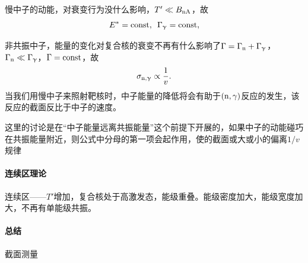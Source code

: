 慢中子的动能，对衰变行为没什么影响，$T' \ll B_{\mathrm n\mathrm{A}}$，故
\[
	E^\ast = \mathrm{const},\enspace\Gamma_\upgamma = \mathrm{const},
\]

非共振中子，能量的变化对复合核的衰变不再有什么影响了$\Gamma = \Gamma_\mathrm n + \Gamma_\upgamma$，$\Gamma_\mathrm n \ll \Gamma_\upgamma$，$\Gamma = \mathrm{const}$，故
\begin{align}
	\label{slow-neutron}
	\sigma_{\mathrm n,\upgamma} \propto \frac1v.
\end{align}
当我们用慢中子来照射靶核时，中子能量的降低将会有助于$(\mathrm n,\gamma)$反应的发生，该反应的截面反比于中子的速度。

这里的讨论是在“中子能量远离共振能量”这个前提下开展的，如果中子的动能碰巧在共振能量附近，则公式中分母的第一项会起作用，使的截面或大或小的偏离$1/v$规律
\paragraph{连续区理论}连续区——$T'$增加，复合核处于高激发态，能级重叠。能级密度加大，能级宽度加大，不再有单能级共振。
\paragraph{总结}截面测量

